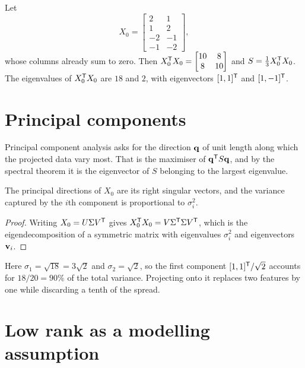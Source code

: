 \begin{example}
Let
\[
	X_0=\begin{bmatrix}2&1\\1&2\\-2&-1\\-1&-2\end{bmatrix},
\]
whose columns already sum to zero. Then
\(X_0^{\mathsf{T}} X_0=\begin{bmatrix}10&8\\8&10\end{bmatrix}\) and
\(S=\tfrac13X_0^{\mathsf{T}} X_0\). The eigenvalues of \(X_0^{\mathsf{T}} X_0\) are \(18\) and \(2\),
with eigenvectors \([1,1]^{\mathsf{T}}\) and \([1,-1]^{\mathsf{T}}\).
\end{example}

\section{Principal components}

Principal component analysis asks for the direction \(\mathbf{q}\) of unit length
along which the projected data vary most. That is the maximiser of
\(\mathbf{q}^{\mathsf{T}} S\mathbf{q}\), and by the spectral theorem it is the eigenvector of
\(S\) belonging to the largest eigenvalue.

\begin{proposition}
The principal directions of \(X_0\) are its right singular vectors, and the
variance captured by the \(i\)th component is proportional to \(\sigma_i^{2}\).
\end{proposition}

\begin{proof}
Writing \(X_0=U\Sigma V^{\mathsf{T}}\) gives \(X_0^{\mathsf{T}} X_0=V\Sigma^{\mathsf{T}}\Sigma V^{\mathsf{T}}\), which is
the eigendecomposition of a symmetric matrix with eigenvalues \(\sigma_i^{2}\)
and eigenvectors \(\mathbf{v}_i\).
\end{proof}

\begin{example}[continued]
Here \(\sigma_1=\sqrt{18}=3\sqrt2\) and \(\sigma_2=\sqrt2\), so the first
component \([1,1]^{\mathsf{T}}/\sqrt2\) accounts for \(18/20=90\%\) of the total variance.
Projecting onto it replaces two features by one while discarding a tenth of the
spread.
\end{example}


\section{Low rank as a modelling assumption}

